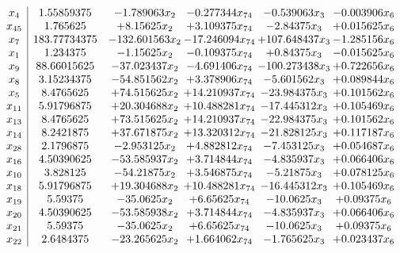 \documentclass[11pt]{article}
\begin{document}
\[\begin{array}{c| c c@{\hskip 2pt} c@{\hskip 2pt} c@{\hskip 2pt} c@{\hskip 2pt} }
 x_{4}   &  1.55859375 & -1.789063 x_{2} & -0.277344 x_{74} & -0.539063 x_{3} & -0.003906 x_{6}\\
 x_{45}   &  1.765625 & + 8.15625 x_{2} & + 3.109375 x_{74} & -2.84375 x_{3} & + 0.015625 x_{6}\\
 x_{7}   &  183.77734375 & -132.601563 x_{2} & -17.246094 x_{74} & + 107.648437 x_{3} & -1.285156 x_{6}\\
 x_{1}   &  1.234375 & -1.15625 x_{2} & -0.109375 x_{74} & + 0.84375 x_{3} & -0.015625 x_{6}\\
 x_{9}   &  88.66015625 & -37.023437 x_{2} & -4.691406 x_{74} & -100.273438 x_{3} & + 0.722656 x_{6}\\
 x_{8}   &  3.15234375 & -54.851562 x_{2} & + 3.378906 x_{74} & -5.601562 x_{3} & + 0.089844 x_{6}\\
 x_{5}   &  8.4765625 & + 74.515625 x_{2} & + 14.210937 x_{74} & -23.984375 x_{3} & + 0.101562 x_{6}\\
 x_{11}   &  5.91796875 & + 20.304688 x_{2} & + 10.488281 x_{74} & -17.445312 x_{3} & + 0.105469 x_{6}\\
 x_{13}   &  8.4765625 & + 73.515625 x_{2} & + 14.210937 x_{74} & -22.984375 x_{3} & + 0.101562 x_{6}\\
 x_{14}   &  8.2421875 & + 37.671875 x_{2} & + 13.320312 x_{74} & -21.828125 x_{3} & + 0.117187 x_{6}\\
 x_{28}   &  2.1796875 & -2.953125 x_{2} & + 4.882812 x_{74} & -7.453125 x_{3} & + 0.054687 x_{6}\\
 x_{16}   &  4.50390625 & -53.585937 x_{2} & + 3.714844 x_{74} & -4.835937 x_{3} & + 0.066406 x_{6}\\
 x_{10}   &  3.828125 & -54.21875 x_{2} & + 3.546875 x_{74} & -5.21875 x_{3} & + 0.078125 x_{6}\\
 x_{18}   &  5.91796875 & + 19.304688 x_{2} & + 10.488281 x_{74} & -16.445312 x_{3} & + 0.105469 x_{6}\\
 x_{19}   &  5.59375 & -35.0625 x_{2} & + 6.65625 x_{74} & -10.0625 x_{3} & + 0.09375 x_{6}\\
 x_{20}   &  4.50390625 & -53.585938 x_{2} & + 3.714844 x_{74} & -4.835937 x_{3} & + 0.066406 x_{6}\\
 x_{21}   &  5.59375 & -35.0625 x_{2} & + 6.65625 x_{74} & -10.0625 x_{3} & + 0.09375 x_{6}\\
 x_{22}   &  2.6484375 & -23.265625 x_{2} & + 1.664062 x_{74} & -1.765625 x_{3} & + 0.023437 x_{6}\\

\end{array}\]
\end{document}
